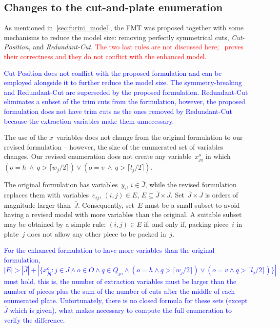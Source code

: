 \documentclass[ppgc,tese,english,formais,babel]{iiufrgs}
\newif\iffinalversion
\newcommand{\newtext}[1]{\iffinalversion%
#1%
\else%
\textcolor{blue}{#1}%
\fi%
}
\newcommand{\oldtext}[1]{\iffinalversion%
\else%
\textcolor{red}{#1}%
\fi%
}
\begin{document}
\subsection{Changes to the cut-and-plate enumeration}
\label{sec:var_enum}

As mentioned in~\cref{sec:furini_model}, the FMT was proposed together with some mechanisms to reduce the model size: removing perfectly symmetrical cuts, \emph{Cut-Position}, and \emph{Redundant-Cut}.
\oldtext{The two last rules are not discussed here; \citet{furini:2016}~proves their correctness and they do not conflict with the enhanced model.}
\newtext{
Cut-Position does not conflict with the proposed formulation and can be employed alongside it to further reduce the model size.
The symmetry-breaking and Redundant-Cut are superseded by the proposed formulation.
Redundant-Cut eliminates a subset of the trim cuts from the formulation, however, the proposed formulation does not have trim cuts as the ones removed by Redundant-Cut because the extraction variables make them unnecessary.
}

The use of the \(x\)~variables does not change from the original formulation to our revised formulation -- however, the size of the enumerated set of variables changes.
Our revised enumeration does not create any variable~\(x^o_{jq}\) in which \((o = h~\land~q > \lceil w_j / 2 \rceil) \lor (o = v~\land~q > \lceil l_j / 2 \rceil)\).

The original formulation has variables~\(y_i\), \(i \in \bar{J}\), while the revised formulation replaces them with variables~\(e_{ij}\), \((i, j) \in E\), \(E \subseteq \bar{J} \times J\).
Set~\(\bar{J} \times J\) is orders of magnitude larger than~\(\bar{J}\).
Consequently, set~\(E\) must be a small subset to avoid having a revised model with more variables than the original.
A suitable subset may be obtained by a simple rule: \((i, j) \in E\) if, and only if, packing piece~\(i\) in plate~\(j\) does not allow any other piece to be packed in~\(j\).

\newtext{
For the enhanced formulation to have more variables than the original formulation, \(|E| > |\bar{J}| + |\{x^o_{jq} : j \in J \land o \in O \land q \in Q_{jo} \land (o = h \land q > \lceil w_j / 2 \rceil) \lor (o = v \land q > \lceil l_j / 2 \rceil)\}|\) must hold, this is, the number of extraction variables must be larger than the number of pieces plus the sum of the number of cuts after the middle of each enumerated plate.
Unfortunately, there is no closed formula for these sets (except \(\bar{J}\) which is given), what makes necessary to compute the full enumeration to verify the difference.
}
\end{document}
